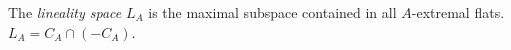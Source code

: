 The \emph{lineality space} $L_A$ is the maximal subspace contained in all $A$-extremal flats. $L_A=C_A\cap(-C_A)$.
